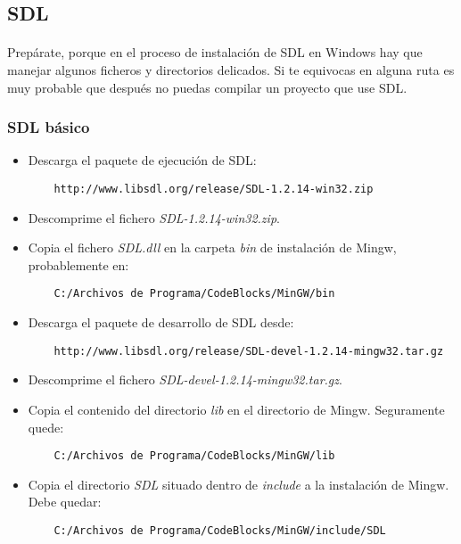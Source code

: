 \documentclass[16pt,spanish]{article}
\begin{document}
\subsection{SDL}

\paragraph{}
Prepárate, porque en el proceso de instalación de SDL en Windows hay que manejar
algunos ficheros y directorios delicados. Si te equivocas en alguna ruta es muy
probable que después no puedas compilar un proyecto que use SDL.

\subsubsection{SDL básico}

\begin{itemize}
	\item Descarga el paquete de ejecución de SDL:
	\begin{verbatim}
	http://www.libsdl.org/release/SDL-1.2.14-win32.zip
	\end{verbatim}
	\item Descomprime el fichero \emph{SDL-1.2.14-win32.zip}.
	\item Copia el fichero \emph{SDL.dll} en la carpeta \emph{bin} de instalación
	de Mingw, probablemente en:
	\begin{verbatim}
	C:/Archivos de Programa/CodeBlocks/MinGW/bin
	\end{verbatim}
	\item Descarga el paquete de desarrollo de SDL desde:
	\begin{verbatim}
	http://www.libsdl.org/release/SDL-devel-1.2.14-mingw32.tar.gz
	\end{verbatim}
	\item Descomprime el fichero \emph{SDL-devel-1.2.14-mingw32.tar.gz}.
	\item Copia el contenido del directorio \emph{lib} en el directorio
	de Mingw. Seguramente quede:
	\begin{verbatim}
	C:/Archivos de Programa/CodeBlocks/MinGW/lib
	\end{verbatim}
	\item Copia el directorio \emph{SDL} situado dentro de \emph{include}
	a la instalación de Mingw. Debe quedar:
	\begin{verbatim}
	C:/Archivos de Programa/CodeBlocks/MinGW/include/SDL
	\end{verbatim}
\end{itemize}
\end{document}

